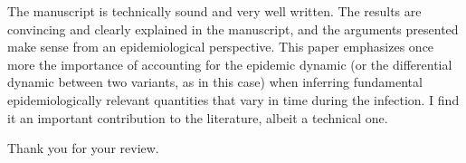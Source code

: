 \documentclass[12pt]{article}
\newcommand{\revtext}{\textsf}
\begin{document}
\revtext{The manuscript is technically sound and very well written. The results are convincing and clearly explained in the manuscript, and the arguments presented make sense from an epidemiological perspective. This paper emphasizes once more the importance of accounting for the epidemic dynamic (or the differential dynamic between two variants, as in this case) when inferring fundamental epidemiologically relevant quantities that vary in time during the infection. I find it an important contribution to the literature, albeit a technical one.}

Thank you for your review.


\end{document}
